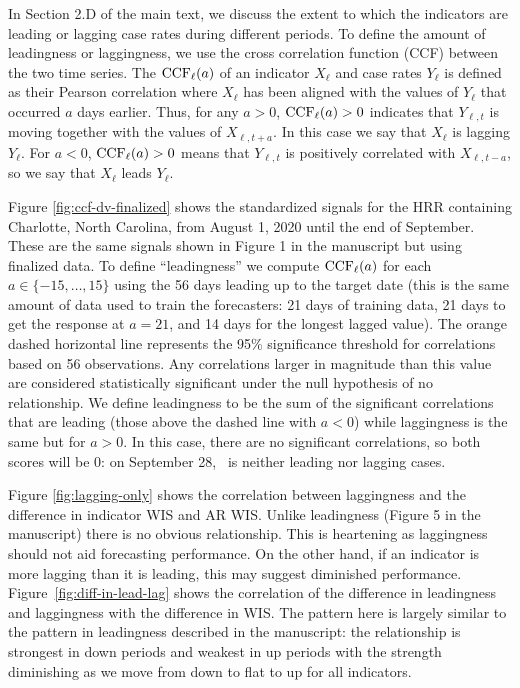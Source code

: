 In Section 2.D of the main text, we discuss the extent to which the indicators
are leading or lagging case rates during different periods. To define the amount
of leadingness or laggingness, we use the cross correlation function (CCF)
between the two time series. The $\mathrm{CCF}_\ell(a)$ of an indicator $X_{\ell}$ and case
rates $Y_{\ell}$ is defined as
their Pearson correlation where $X_\ell$ has been
aligned
with the values of $Y_{\ell}$ that occurred $a$ days earlier.
Thus, for any $a>0$, $\mathrm{CCF}_{\ell}(a)>0$ indicates that
$Y_{\ell,t}$ is moving together with the values of $X_{\ell,t+a}$.
In this case we say that $X_{\ell}$ is lagging
$Y_{\ell}$. For $a<0$, $\mathrm{CCF}_{\ell}(a)>0$ means that $Y_{\ell,t}$ is
positively correlated with $X_{\ell,t-a}$, so we say that
$X_{\ell}$ leads $Y_{\ell}$.

Figure \ref{fig:ccf-dv-finalized} shows the standardized signals for the HRR
containing Charlotte, North Carolina, from August 1, 2020 until the end of
September. These are the same signals shown in Figure 1 in the manuscript but
using finalized data. To
define ``leadingness'' we compute $\mathrm{CCF}_{\ell}(a)$ for each $a\in
\{-15,\ldots,15\}$ using the 56 days leading up to the target date (this is the same
amount of data used to train the forecasters: 21 days of training data, 21 days
to get the response at $a=21$, and 14 days for the longest lagged value). The
orange dashed horizontal line represents the 95\% significance threshold for
correlations based on 56 observations. Any correlations larger in magnitude than
this value are considered statistically significant under the null hypothesis of
no relationship. We define leadingness to be the sum of the significant
correlations that are leading (those above the dashed line with $a<0$) while
laggingness is the same but for $a>0$. In this case, there are no significant
correlations, so both scores will be 0: on September 28, \dv~is neither
leading nor lagging cases.

Figure \ref{fig:lagging-only} shows the correlation between laggingness and the
difference in indicator WIS and AR WIS. Unlike leadingness (Figure 5 in the
manuscript) there is no obvious relationship. This is heartening as laggingness
should not aid forecasting performance. On the other hand, if an indicator is
more lagging than it is leading, this may suggest diminished performance.
Figure~\ref{fig:diff-in-lead-lag} shows the correlation of the difference in
leadingness and laggingness with the difference in WIS. The pattern here is
largely similar to the pattern in leadingness described in the manuscript: the
relationship is strongest in down periods and weakest in up periods with the
strength diminishing as we move from down to flat to up for all indicators. 

